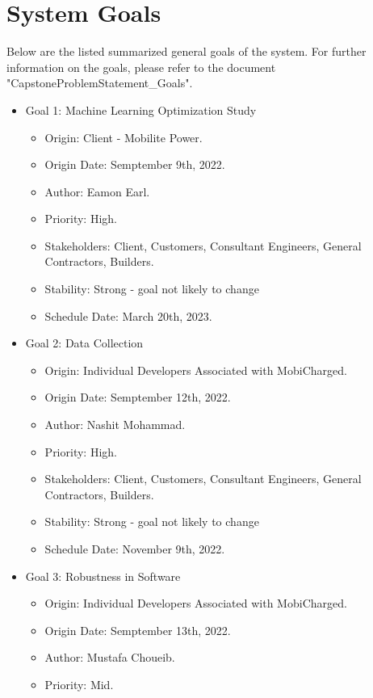 \documentclass[12pt, titlepage]{article}
\begin{document}
\section{System Goals}
Below are the listed summarized general goals of the system. For further information on the goals, please refer to the document "CapstoneProblemStatement\_Goals".

\begin{itemize}
    \item Goal 1: Machine Learning Optimization Study
    \begin{itemize}
        \item Origin: Client - Mobilite Power.
        \item Origin Date: Semptember 9th, 2022.
        \item Author: Eamon Earl.
        \item Priority: High.
        \item Stakeholders: Client, Customers, Consultant Engineers, General Contractors, Builders.
        \item Stability: Strong - goal not likely to change
        \item Schedule Date: March 20th, 2023.
    \end{itemize}
    \item Goal 2: Data Collection
    \begin{itemize}
        \item Origin: Individual Developers Associated with MobiCharged.
        \item Origin Date: Semptember 12th, 2022.
        \item Author: Nashit Mohammad.
        \item Priority: High.
        \item Stakeholders: Client, Customers, Consultant Engineers, General Contractors, Builders.
        \item Stability: Strong - goal not likely to change
        \item Schedule Date: November 9th, 2022.
    \end{itemize}
    \item Goal 3: Robustness in Software
    \begin{itemize}
        \item Origin: Individual Developers Associated with MobiCharged.
        \item Origin Date: Semptember 13th, 2022.
        \item Author: Mustafa Choueib.
        \item Priority: Mid.

\end{itemize}
\end{itemize}
\end{document}
